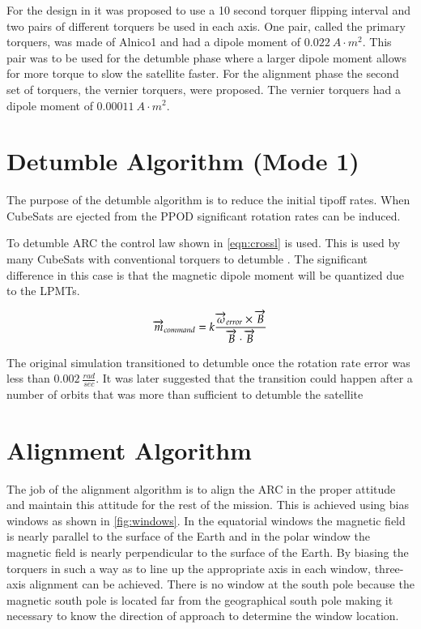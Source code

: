 For the design in \cite{Mentch11} it was proposed to use a 10 second torquer flipping interval and two pairs of different torquers be used in each axis. One pair, called the primary torquers, was made of Alnico1 and had a dipole moment of $0.022~\unit{A}{\cdot}\unit{m^2}$. This pair was to be used for the detumble phase where a larger dipole moment allows for more torque to slow the satellite faster. For the alignment phase the second set of torquers, the vernier torquers, were proposed. The vernier torquers had a dipole moment of $0.00011~\unit{A}{\cdot}\unit{m^2}$.

\section{Detumble Algorithm (Mode 1)}

The purpose of the detumble algorithm is to reduce the initial tipoff rates. When CubeSats are ejected from the \ac{PPOD} significant rotation rates can be induced.

To detumble \ac{ARC} the control law shown in \cref{eqn:crossl} is used. This is used by many CubeSats with conventional torquers to detumble . The significant difference in this case is that the magnetic dipole moment will be quantized due to the \acp{LPMT}.

\begin{equation}
\overrightarrow{m}_{command} = k {{\overrightarrow{\omega}_{error} \times \overrightarrow{B}} \over{\overrightarrow{B} \cdot \overrightarrow{B}}}
\label{eqn:crossl}
\end{equation}

The original simulation transitioned to detumble once the rotation rate error was less than $0.002~\unit{\frac{rad}{sec}}$. It was later suggested that the transition could happen after a number of orbits that was more than sufficient to detumble the satellite

\section{Alignment Algorithm}

The job of the alignment algorithm is to align the \ac{ARC} in the proper attitude and maintain this attitude for the rest of the mission. This is achieved using bias windows as shown in \cref{fig:windows}. In the equatorial windows the magnetic field is nearly parallel to the surface of the Earth and in the polar window the magnetic field is nearly perpendicular to the surface of the Earth. By biasing the torquers in such a way as to line up the appropriate axis in each window, three-axis alignment can be achieved. There is no window at the south pole because the magnetic south pole is located far from the geographical south pole making it necessary to know the direction of approach to determine the window location.

